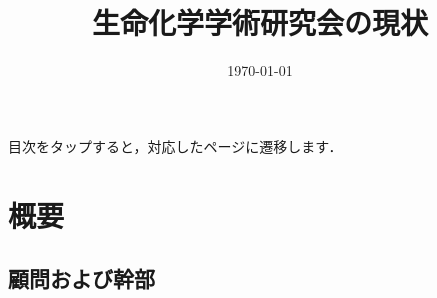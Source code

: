 \documentclass[a4paper,11pt]{ltjsarticle}
\title{生命化学学術研究会の現状}
\author{\today}
\date{}
\begin{document}
\pagestyle{fancy}
\rhead{}
\cfoot{\thepage}

\maketitle

\tableofcontents

\hspace*{12pt}

目次をタップすると，対応したページに遷移します．

\clearpage

\section{概要}

\subsection{顧問および幹部}
\end{document}
